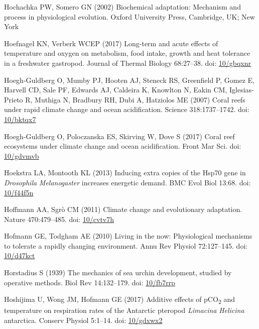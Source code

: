 \documentclass[a4paper,10pt, oneside]{memoir}
\begin{document}
\leavevmode\hypertarget{ref-Hochachka2002}{}%
Hochachka PW, Somero GN (2002) Biochemical adaptation: Mechanism and process in physiological evolution. Oxford University Press, Cambridge, UK; New York

\leavevmode\hypertarget{ref-Hoefnagel2017}{}%
Hoefnagel KN, Verberk WCEP (2017) Long-term and acute effects of temperature and oxygen on metabolism, food intake, growth and heat tolerance in a freshwater gastropod. Journal of Thermal Biology 68:27--38. doi: \href{https://doi.org/10/gbqxnr}{10/gbqxnr}

\leavevmode\hypertarget{ref-Hoegh-Guldberg2007}{}%
Hoegh-Guldberg O, Mumby PJ, Hooten AJ, Steneck RS, Greenfield P, Gomez E, Harvell CD, Sale PF, Edwards AJ, Caldeira K, Knowlton N, Eakin CM, Iglesias-Prieto R, Muthiga N, Bradbury RH, Dubi A, Hatziolos ME (2007) Coral reefs under rapid climate change and ocean acidification. Science 318:1737--1742. doi: \href{https://doi.org/10/bktqx7}{10/bktqx7}

\leavevmode\hypertarget{ref-Hoegh-Guldberg2017}{}%
Hoegh-Guldberg O, Poloczanska ES, Skirving W, Dove S (2017) Coral reef ecosystems under climate change and ocean acidification. Front Mar Sci. doi: \href{https://doi.org/10/gdvmvb}{10/gdvmvb}

\leavevmode\hypertarget{ref-Hoekstra2013}{}%
Hoekstra LA, Montooth KL (2013) Inducing extra copies of the Hsp70 gene in \emph{Drosophila} \emph{Melanogaster} increases energetic demand. BMC Evol Biol 13:68. doi: \href{https://doi.org/10/f44f5n}{10/f44f5n}

\leavevmode\hypertarget{ref-Hoffmann2011}{}%
Hoffmann AA, Sgrò CM (2011) Climate change and evolutionary adaptation. Nature 470:479--485. doi: \href{https://doi.org/10/cvtv7h}{10/cvtv7h}

\leavevmode\hypertarget{ref-Hofmann2010}{}%
Hofmann GE, Todgham AE (2010) Living in the now: Physiological mechanisms to tolerate a rapidly changing environment. Annu Rev Physiol 72:127--145. doi: \href{https://doi.org/10/d47kct}{10/d47kct}

\leavevmode\hypertarget{ref-Horstadius1939}{}%
Horstadius S (1939) The mechanics of sea urchin development, studied by operative methods. Biol Rev 14:132--179. doi: \href{https://doi.org/10/fb7rrp}{10/fb7rrp}

\leavevmode\hypertarget{ref-Hoshijima2017}{}%
Hoshijima U, Wong JM, Hofmann GE (2017) Additive effects of pCO\textsubscript{2} and temperature on respiration rates of the Antarctic pteropod \emph{Limacina} \emph{Helicina} antarctica. Conserv Physiol 5:1--14. doi: \href{https://doi.org/10/gdxwx2}{10/gdxwx2}
\end{document}
